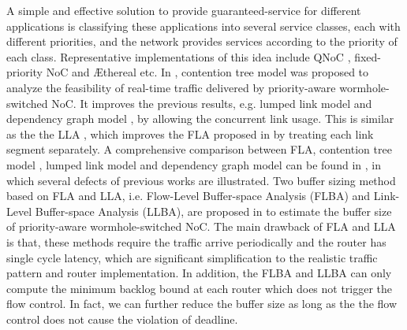 \documentclass[10pt,journal]{IEEEtran}
\begin{document}
A simple and effective solution to provide guaranteed-service for different applications is classifying these applications into several service classes, each with different priorities, and the network provides services according to the priority of each class. Representative implementations of this idea include QNoC \cite{BCGK04}, fixed-priority NoC \cite{Shi:2008:RCA:1397757.1397996} and {{\AE}thereal} \cite{GoDR05} etc. In \cite{LuJS05}, contention tree model was proposed to analyze the feasibility of real-time traffic delivered by priority-aware wormhole-switched NoC. It improves the previous results, e.g. lumped link model \cite{707545} and dependency graph model \cite{708526}, by allowing the concurrent link usage. This is similar as the the LLA \cite{73}, which improves the FLA proposed in \cite{Shi:2008:RCA:1397757.1397996} by treating each link segment separately. A comprehensive comparison between FLA, contention tree model \cite{LuJS05}, lumped link model \cite{707545} and dependency graph model \cite{708526} can be found in \cite{Shi2009}, in which several defects of previous works are illustrated. Two buffer sizing method based on FLA and LLA, i.e. Flow-Level Buffer-space Analysis (FLBA) and Link-Level Buffer-space Analysis (LLBA), are proposed in \cite{189} to estimate the buffer size of priority-aware wormhole-switched NoC. The main drawback of FLA and LLA is that, these methods require the traffic arrive periodically and the router has single cycle latency, which are significant simplification to the realistic traffic pattern and router implementation. In addition, the FLBA and LLBA can only compute the minimum backlog bound at each router which does not trigger the flow control. In fact, we can further reduce the buffer size as long as the the flow control does not cause the violation of deadline.
\end{document}
